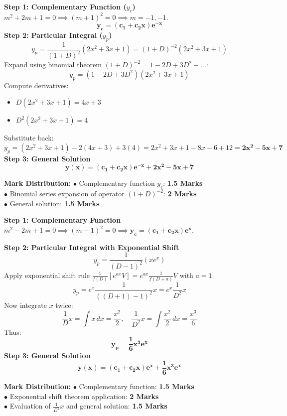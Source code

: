 \begin{solutionbox}
\textbf{Step 1: Complementary Function ($y_c$)}
$m^2 + 2m + 1 = 0 \implies (m + 1)^2 = 0 \implies m = -1, -1$.
\[
\mathbf{y_c = (c_1 + c_2 x)e^{-x}}
\]
\textbf{Step 2: Particular Integral ($y_p$)}
\[
y_p = \frac{1}{(1 + D)^2} (2x^2 + 3x + 1) = (1 + D)^{-2} (2x^2 + 3x + 1)
\]
Expand using binomial theorem $(1+D)^{-2} = 1 - 2D + 3D^2 - \dots$:
\[
y_p = (1 - 2D + 3D^2)(2x^2 + 3x + 1)
\]
Compute derivatives:
\begin{itemize}[leftmargin=6mm]
    \item $D(2x^2 + 3x + 1) = 4x + 3$
    \item $D^2(2x^2 + 3x + 1) = 4$
\end{itemize}
Substitute back:
\[
y_p = (2x^2 + 3x + 1) - 2(4x + 3) + 3(4) = 2x^2 + 3x + 1 - 8x - 6 + 12 = \mathbf{2x^2 - 5x + 7}
\]
\textbf{Step 3: General Solution}
\[
\mathbf{y(x) = (c_1 + c_2 x)e^{-x} + 2x^2 - 5x + 7}
\]

\begin{markingrubric}
\textbf{Mark Distribution:}
$\bullet$ Complementary function $y_c$: \textbf{1.5 Marks}\\
$\bullet$ Binomial series expansion of operator $(1+D)^{-2}$: \textbf{2 Marks}\\
$\bullet$ General solution: \textbf{1.5 Marks}
\end{markingrubric}
\end{solutionbox}

\begin{solutionbox}
\textbf{Step 1: Complementary Function}
$m^2 - 2m + 1 = 0 \implies (m - 1)^2 = 0 \implies \mathbf{y_c = (c_1 + c_2 x)e^x}$.

\textbf{Step 2: Particular Integral with Exponential Shift}
\[
y_p = \frac{1}{(D - 1)^2} (x e^x)
\]
Apply exponential shift rule $\frac{1}{f(D)} [e^{ax} V] = e^{ax} \frac{1}{f(D+a)} V$ with $a = 1$:
\[
y_p = e^x \frac{1}{((D + 1) - 1)^2} x = e^x \frac{1}{D^2} x
\]
Now integrate $x$ twice:
\[
\frac{1}{D} x = \int x \, dx = \frac{x^2}{2}, \quad \frac{1}{D^2} x = \int \frac{x^2}{2} \, dx = \frac{x^3}{6}
\]
Thus:
\[
\mathbf{y_p = \frac{1}{6} x^3 e^x}
\]
\textbf{Step 3: General Solution}
\[
\mathbf{y(x) = (c_1 + c_2 x)e^x + \frac{1}{6} x^3 e^x}
\]

\begin{markingrubric}
\textbf{Mark Distribution:}
$\bullet$ Complementary function: \textbf{1.5 Marks}\\
$\bullet$ Exponential shift theorem application: \textbf{2 Marks}\\
$\bullet$ Evaluation of $\frac{1}{D^2} x$ and general solution: \textbf{1.5 Marks}
\end{markingrubric}
\end{solutionbox}

